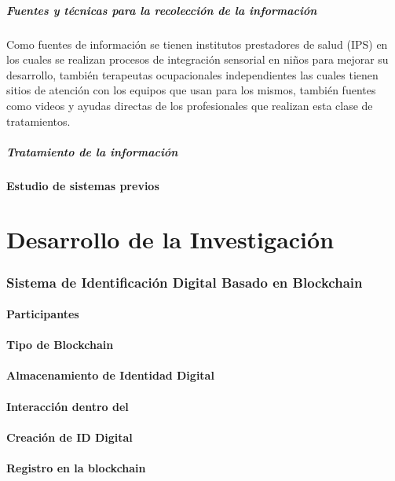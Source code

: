     \subsubsection{Fuentes y técnicas para la recolección de la información}
    Como fuentes de información se tienen institutos prestadores de salud (IPS) en los cuales se realizan procesos de integración sensorial en niños para mejorar su desarrollo, también terapeutas ocupacionales independientes las cuales tienen sitios de atención con los equipos que usan para los mismos, también fuentes como videos y ayudas directas de los profesionales que realizan esta clase de tratamientos.
    \subsubsection{Tratamiento de la información}
    \subsection{Estudio de sistemas previos}
    \part{Desarrollo de la Investigación}
    \section{Sistema de Identificación Digital Basado en Blockchain}
    \subsection{Participantes}
    \subsection{Tipo de Blockchain}
    \subsection{Almacenamiento de Identidad Digital}
    \subsection{Interacción dentro del}
    \subsection{Creación de ID Digital}
    \subsection{Registro en la blockchain}
